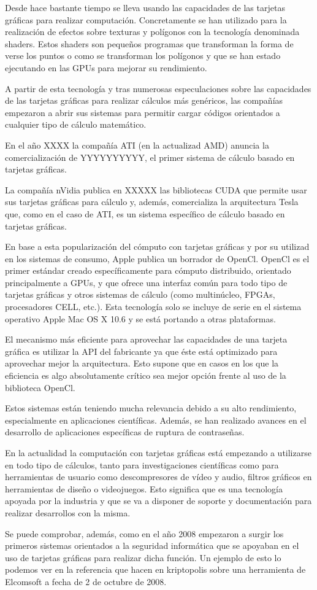 Desde hace bastante tiempo se lleva usando las capacidades de las tarjetas gráficas para realizar computación. Concretamente se han utilizado para la realización de efectos sobre texturas y polígonos con la tecnología denominada shaders. Estos shaders son pequeños programas que transforman la forma de verse los puntos o como se transforman los polígonos y que se han estado ejecutando en las GPUs para mejorar su rendimiento.

A partir de esta tecnología y tras numerosas especulaciones sobre las capacidades de las tarjetas gráficas para realizar cálculos más genéricos, las compañías empezaron a abrir sus sistemas para permitir cargar códigos orientados a cualquier tipo de cálculo matemático.

En el año XXXX la compañía ATI (en la actualizad AMD) anuncia la comercialización de YYYYYYYYYY, el primer sistema de cálculo basado en tarjetas gráficas.

La compañía nVidia publica en XXXXX las bibliotecas CUDA que permite usar sus tarjetas gráficas para cálculo y, además, comercializa la arquitectura Tesla que, como en el caso de ATI, es un sistema específico de cálculo basado en tarjetas gráficas.

En base a esta popularización del cómputo con tarjetas gráficas y por  su utilizad en los sistemas  de consumo, Apple publica un borrador de OpenCl. OpenCl es  el primer estándar creado específicamente para cómputo distribuido, orientado principalmente a GPUs, y que ofrece una interfaz común para todo tipo de tarjetas gráficas y otros sistemas de cálculo (como multinúcleo, FPGAs, procesadores CELL, etc.). Esta tecnología solo se incluye de serie en el sistema operativo Apple Mac OS X 10.6 y se está portando a otras plataformas.

El mecanismo más eficiente para aprovechar las capacidades de una tarjeta gráfica es utilizar la API del fabricante ya que éste está optimizado para aprovechar mejor la arquitectura. Esto supone que en casos en los que la eficiencia es algo absolutamente crítico sea mejor opción frente al uso de la biblioteca OpenCl.

Estos sistemas están teniendo mucha relevancia debido a su alto rendimiento, especialmente en aplicaciones científicas. Además, se han realizado avances en el desarrollo de aplicaciones específicas de ruptura de contraseñas.

En la actualidad la computación con tarjetas gráficas está empezando a utilizarse en todo tipo de cálculos, tanto para investigaciones científicas como para herramientas de usuario como descompresores de vídeo y audio, filtros gráficos en herramientas de diseño o videojuegos. Esto significa que es una tecnología apoyada por la industria y que se va a disponer de soporte y documentación para realizar desarrollos con la misma.

Se puede comprobar, además, como en el año 2008 empezaron a surgir los primeros sistemas orientados a la seguridad informática que se apoyaban en el uso de tarjetas gráficas para realizar dicha función. Un ejemplo de esto lo podemos ver en la referencia que hacen en kriptopolis sobre una herramienta de Elcomsoft a fecha de 2 de octubre de 2008.
